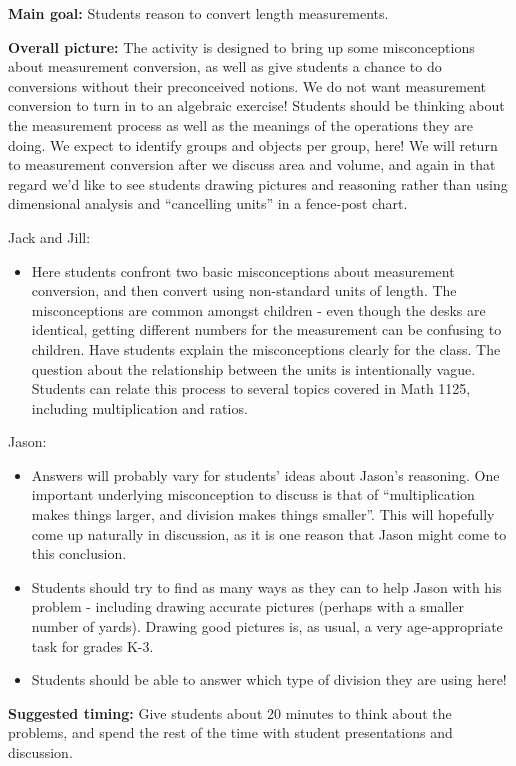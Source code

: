 \documentclass[nooutcomes,noauthor]{ximera}
\begin{document}
\newpage

\begin{instructorNotes}
{\bf Main goal:} Students reason to convert length measurements.

{\bf Overall picture:} The activity is designed to bring up some misconceptions about measurement conversion, as well as give students a chance to do conversions without their preconceived notions.   We do not want measurement conversion to turn in to an algebraic exercise! Students should be thinking about the measurement process as well as the meanings of the operations they are doing. We expect to identify groups and objects per group, here! We will return to measurement conversion after we discuss area and volume, and again in that regard we'd like to see students drawing pictures and reasoning rather than using dimensional analysis and ``cancelling units'' in a fence-post chart. 

Jack and Jill:
\begin{itemize}
\item     Here students confront two basic misconceptions about measurement conversion, and then convert using non-standard units of length.  The misconceptions are common amongst children - even though the desks are identical, getting different numbers for the measurement can be confusing to children.  Have students explain the misconceptions clearly for the class.  The question about the relationship between the units is intentionally vague.  Students can relate this process to several topics covered in Math 1125, including multiplication and ratios.
\end{itemize}


Jason:

\begin{itemize}
\item     Answers will probably vary for students' ideas about Jason's reasoning.  One important underlying misconception to discuss is that of ``multiplication makes things larger, and division makes things smaller''.  This will hopefully come up naturally in discussion, as it is one reason that Jason might come to this conclusion.  
    
\item    Students should try to find as many ways as they can to help Jason with his problem - including drawing accurate pictures (perhaps with a smaller number of yards).  Drawing good pictures is, as usual, a very age-appropriate task for grades K-3.
\item Students should be able to answer which type of division they are using here!
\end{itemize}



{\bf Suggested timing:} Give students about 20 minutes to think about the problems, and spend the rest of the time with student presentations and discussion.




\end{instructorNotes}
\end{document}
